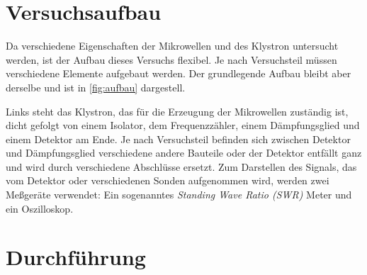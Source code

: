 
\section{Versuchsaufbau}

Da verschiedene Eigenschaften der Mikrowellen und des Klystron
untersucht werden, ist der Aufbau dieses Versuchs flexibel.  Je nach
Versuchsteil müssen verschiedene Elemente aufgebaut werden.  Der
grundlegende Aufbau bleibt aber derselbe und ist in \cref{fig:aufbau}
dargestell.

Links steht das Klystron, das für die Erzeugung der Mikrowellen
zuständig ist, dicht gefolgt von einem Isolator, dem Frequenzzähler,
einem Dämpfungsglied und einem Detektor am Ende. Je nach Versuchsteil
befinden sich zwischen Detektor und Dämpfungsglied verschiedene andere
Bauteile oder der Detektor entfällt ganz und wird durch verschiedene
Abschlüsse ersetzt.  Zum Darstellen des Signals, das vom Detektor oder
verschiedenen Sonden aufgenommen wird, werden zwei Meßgeräte verwendet:
Ein sogenanntes \emph{Standing Wave Ratio (SWR)} Meter und ein
Oszilloskop.

\section{Durchführung}
